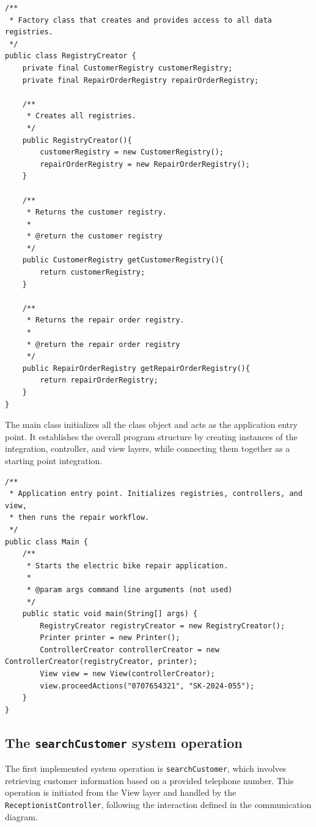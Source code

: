 \documentclass[a4paper]{scrartcl}
\begin{document}
\begin{lstlisting}[style=javastyle, caption={Main class entry point}]
/**
 * Factory class that creates and provides access to all data registries.
 */
public class RegistryCreator {
    private final CustomerRegistry customerRegistry;
    private final RepairOrderRegistry repairOrderRegistry;

    /**
     * Creates all registries.
     */
    public RegistryCreator(){
        customerRegistry = new CustomerRegistry();
        repairOrderRegistry = new RepairOrderRegistry();
    }

    /**
     * Returns the customer registry.
     *
     * @return the customer registry
     */
    public CustomerRegistry getCustomerRegistry(){
        return customerRegistry;
    }

    /**
     * Returns the repair order registry.
     *
     * @return the repair order registry
     */
    public RepairOrderRegistry getRepairOrderRegistry(){
        return repairOrderRegistry;
    }
}
\end{lstlisting}

The main class initializes all the class object and acts as the application entry point. It establishes the overall program structure by creating instances of the integration, controller, and view layers, while connecting them together as a starting point integration.

\begin{lstlisting}[style=javastyle, caption={Main class entry point}]
/**
 * Application entry point. Initializes registries, controllers, and view, 
 * then runs the repair workflow.
 */
public class Main {
    /**
     * Starts the electric bike repair application.
     *
     * @param args command line arguments (not used)
     */
    public static void main(String[] args) {
        RegistryCreator registryCreator = new RegistryCreator();
        Printer printer = new Printer();
        ControllerCreator controllerCreator = new ControllerCreator(registryCreator, printer);
        View view = new View(controllerCreator);
        view.proceedActions("0707654321", "SK-2024-055");
    }
}
\end{lstlisting}


\subsection{The \texttt{searchCustomer} system operation}

The first implemented system operation is \texttt{searchCustomer}, which involves retrieving customer information based on a provided telephone number. This operation is initiated from the View layer and handled by the \texttt{ReceptionistController}, following the interaction defined in the communication diagram.
\end{document}
